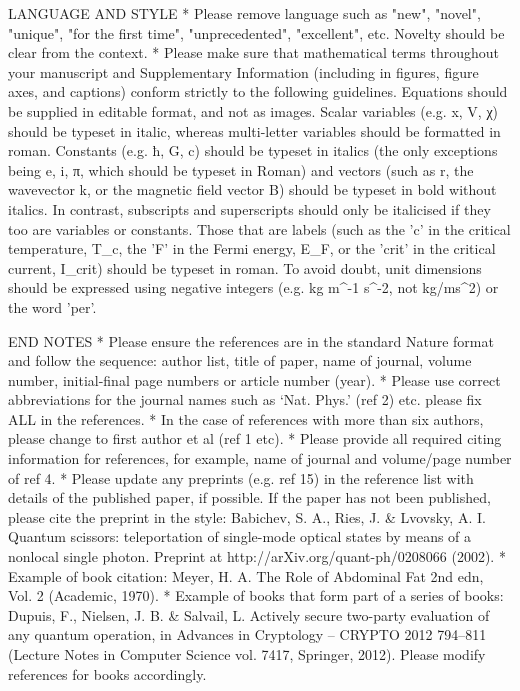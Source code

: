 \documentclass[11pt, a4paper]{letter} %
\begin{document}
LANGUAGE AND STYLE
* Please remove language such as "new", "novel", "unique", "for the first time", "unprecedented", "excellent", etc. Novelty should be clear from the context.
* Please make sure that mathematical terms throughout your manuscript and Supplementary Information (including in figures, figure axes, and captions) conform strictly to the following guidelines. Equations should be supplied in editable format, and not as images. Scalar variables (e.g. x, V, χ) should be typeset in italic, whereas multi-letter variables should be formatted in roman. Constants (e.g. ħ, G, c) should be typeset in italics (the only exceptions being e, i, π, which should be typeset in Roman) and vectors (such as r, the wavevector k, or the magnetic field vector B) should be typeset in bold without italics. In contrast, subscripts and superscripts should only be italicised if they too are variables or constants. Those that are labels (such as the 'c' in the critical temperature, T_c, the 'F' in the Fermi energy, E_F, or the 'crit' in the critical current, I_crit) should be typeset in roman. To avoid doubt, unit dimensions should be expressed using
negative integers (e.g. kg m^-1 s^-2, not kg/ms^2) or the word 'per'.

END NOTES
* Please ensure the references are in the standard Nature format and follow the sequence: author list, title of paper, name of journal, volume number, initial-final page numbers or article number (year).
* Please use correct abbreviations for the journal names such as ‘Nat. Phys.’ (ref 2) etc. please fix ALL in the references.
* In the case of references with more than six authors, please change to first author et al (ref 1 etc).
* Please provide all required citing information for references, for example, name of journal and volume/page number of ref 4.
* Please update any preprints (e.g. ref 15) in the reference list with details of the published paper, if possible. If the paper has not been published, please cite the preprint in the style: Babichev, S. A., Ries, J. & Lvovsky, A. I. Quantum scissors: teleportation of single-mode optical states by means of a nonlocal single photon. Preprint at http://arXiv.org/quant-ph/0208066 (2002).
* Example of book citation: Meyer, H. A. The Role of Abdominal Fat 2nd edn, Vol. 2 (Academic, 1970).
* Example of books that form part of a series of books: Dupuis, F., Nielsen, J. B. & Salvail, L. Actively secure two-party evaluation of any quantum operation, in Advances in Cryptology – CRYPTO 2012 794–811 (Lecture Notes in Computer Science vol. 7417, Springer, 2012). Please modify references for books accordingly.
\end{document}
